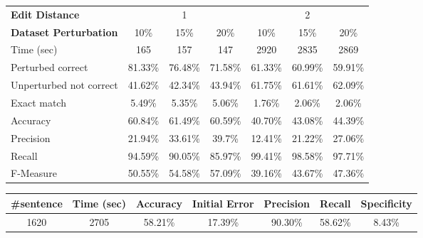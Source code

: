 
\begin{figure}[H]
	\centering
	\begin{tabular}{lccc|ccc}
		\toprule
		\textbf{Edit Distance} & \multicolumn{3}{c|}{1} & \multicolumn{3}{c}{2}\\
		\textbf{Dataset Perturbation} & \num{10}\% & \num{15}\%& \num{20}\% & \num{10}\% & \num{15}\%& 
		\num{20}\% \\
		\midrule
		Time (sec) &\num{165}&\num{157}& \num{147}&\num{2920}&\num{2835}&\num{2869}\\
		\midrule
		Perturbed correct & \num{81,33}\% &\num{76,48}\%& \num{71,58}\%& \num{61,33}\% 
		&\num{60,99}\% 
		&\num{59,91}\%\\
		Unperturbed not correct &\num{41,62}\%&\num{42,34}\% & \num{43,94}\% & \num{61,75}\% & 
		\num{61,61}\% & 
		\num{62,09}\%\\
		Exact match &\num{5,49}\%&\num{5,35}\%&\num{5,06}\%&\num{1,76}\%&\num{2,06}\%&\num{2,06}\%\\
		Accuracy &\num{60,84}\% &\num{61,49}\% &\num{60,59}\% &\num{40,70}\% &\num{43,08}\% 
		&\num{44,39}\% \\
		Precision&\num{21,94}\%&\num{33,61}\% &\num{39,7}\%&\num{12,41}\%&\num{21,22}\%&\num{27,06}\%\\
		Recall&\num{94,59}\%&\num{90,05}\%&\num{85,97}\%&\num{99,41}\%&\num{98,58}\%&\num{97,71}\%\\
		F-Measure&\num{50,55}\%&\num{54,58}\%&\num{57,09}\%&\num{39,16}\%&\num{43,67}\%&\num{47,36}\%\\
		\bottomrule
	\end{tabular}
	\label{tab:sentence-eval3a}
\end{figure}


\begin{figure}[H]
	\centering
	\begin{tabular}{ccccccc}
		\toprule
		\#sentence & Time (sec)  & Accuracy & Initial Error  &  Precision & Recall & Specificity \\
		\midrule
		\num{1620}	& \num{2705}  & \num{58,21}\%  & \num{17,39}\% & \num{90,30}\% & \num{58,62}\%  & 
		\num{8,43}\%  
		\\
		\bottomrule
	\end{tabular}
	\label{tab:sentence-eval3}
\end{figure}